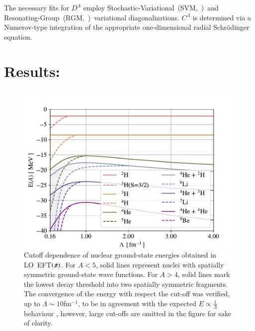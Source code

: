 \documentclass[preprint,12pt]{elsarticle}
\newcommand{\lec}{C^\Lambda}
\newcommand{\led}{D^\Lambda}
\newcommand{\eftnopi}{\mbox{EFT$(\not \! \pi)$}}
\begin{document}
The necessary fits for $\led$ employ Stochastic-Variational~(SVM,~\cite{Suzuki:1631377})~and
Resonating-Group~(RGM,~\cite{PhysRev.52.1083,hmh-rrgm})~variational diagonalizations. $\lec$ is
determined via a Numerov-type integration of the appropriate one-dimensional
radial Schr\"odinger equation.





\section*{Results:}


\begin{figure}
\centering
\includegraphics[width=\linewidth]{./Nuclear.pdf} 
\caption{Cutoff dependence of nuclear ground-state energies
obtained in LO~\eftnopi. For $A<5$, solid lines represent nuclei with
spatially symmetric ground-state wave functions. For $A>4$,
solid lines mark the lowest decay threshold into two spatially symmetric fragments.
The convergence of the energy with respect the cut-off was verified, up to $\Lambda\sim 10$fm$^{-1}$, to be in agreement with the expected $E\propto\tfrac{1}{\Lambda}$ behaviour \cite{Bedaque:1998kg, Barnea:2013uqa}, however, large cut-offs are omitted in the figure for sake of clarity.}
\label{fig:nuclear}
\end{figure}
\end{document}
